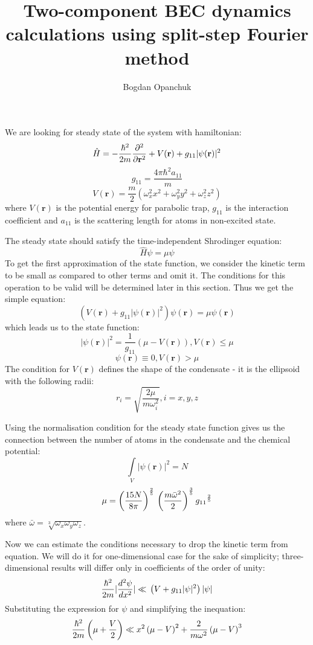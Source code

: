 \documentclass[12pt,notitlepage]{report}
\title{Two-component BEC dynamics calculations using split-step Fourier method}
\author{Bogdan Opanchuk}
\begin{document}
We are looking for steady state of the system with hamiltonian:
\[ 
\hat{H} = -\frac{\hbar^2}{2m} \frac{\partial^2}{\partial \mathbf{r}^2} + \\
V(\mathbf{r}) + \\
g_{11} \vert \psi(\mathbf{r}) \vert^2 
\]
\[g_{11} = \frac{4 \pi \hbar^2 a_{11}}{m}\]
\[ V(\mathbf{r}) = \frac{m}{2} \left( \omega_x^2 x^2 + \omega_y^2 y^2 + \omega_z^2 z^2 \right) \]
where $V(\mathbf{r})$ is the potential energy for parabolic trap, $g_{11}$ is the interaction coefficient
and $a_{11}$ is the scattering length for atoms in non-excited state.

The steady state should satisfy the time-independent Shrodinger equation:
\[ \hat{H} \psi = \mu \psi \]
To get the first approximation of the state function, we consider the kinetic term to be small as compared to other terms and omit it. The conditions for this operation to be valid will be determined later in this section. Thus we get the simple equation:
\[ \left( V(\mathbf{r}) + g_{11} \vert \psi(\mathbf{r}) \vert^2 \right) \psi(\mathbf{r}) = \mu \psi(\mathbf{r}) \]
which leads us to the state function:
\[ \vert \psi(\mathbf{r}) \vert^2 = \frac{1}{g_{11}} \left( \mu - V(\mathbf{r}) \right), V(\mathbf{r}) \leq \mu \]
\[ \psi(\mathbf{r}) \equiv 0, V(\mathbf{r}) > \mu \]
The condition for $V(\mathbf{r})$ defines the shape of the condensate - it is the ellipsoid with the following radii:
\[ r_i = \sqrt{\frac{2 \mu}{m \omega_i^2}}, i = x, y, z \]

Using the normalisation condition for the steady state function gives us the connection between the number of atoms in the condensate and the chemical potential:
\[ \int\limits_{V} \vert \psi(\mathbf{r}) \vert^2 = N \]
\[ 
\mu = \left( \frac{15 N}{8 \pi} \right)^\frac{2}{5} \\
\left( \frac{m \bar{\omega}^2}{2} \right)^\frac{3}{5} \\
{g_{11}}^\frac{2}{5}
\]
where $\bar{\omega} = \sqrt[3]{\omega_x \omega_y \omega_z}$.

Now we can estimate the conditions necessary to drop the kinetic term from equation. We will do it for one-dimensional case for the sake of simplicity; three-dimensional results will differ only in coefficients of the order of unity:
\[ 
\frac{\hbar^2}{2 m} \vert \frac{d^2 \psi}{d x^2} \vert \ll \\
\left( V + g_{11} \vert \psi \vert^2 \right) \vert \psi \vert
\]
Substituting the expression for $\psi$ and simplifying the inequation:
\[
\frac{\hbar^2}{2 m} \left( \mu + \frac{V}{2} \right) \ll \\
x^2 \left( \mu - V \right)^2 + \frac{2}{m \omega^2} \left( \mu - V \right)^3
\]
\end{document}
